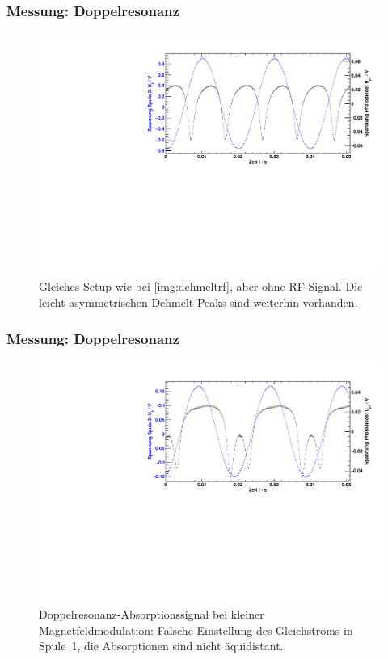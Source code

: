 \begin{frame}
\frametitle{Messung: Doppelresonanz}
\begin{figure}
    \begin{center}
        \includegraphics[width=\textwidth]{../img/07.pdf}
        \caption{Gleiches Setup wie bei \autoref{img:dehmeltrf}, aber ohne RF-Signal.
        Die leicht asymmetrischen Dehmelt-Peaks sind weiterhin vorhanden.}
        \label{img:dehmelt}
    \end{center}
\end{figure}
\end{frame}


\begin{frame}
\frametitle{Messung: Doppelresonanz}
\begin{figure}
    \begin{center}
        \includegraphics[width=\textwidth]{../img/11.pdf}
        \caption{Doppelresonanz-Absorptionssignal bei kleiner Magnetfeldmodulation:
        Falsche Einstellung des Gleichstroms in Spule~1,
        die Absorptionen sind nicht äquidistant.}
        \label{img:rfwrong}
    \end{center}
\end{figure}
\end{frame}


